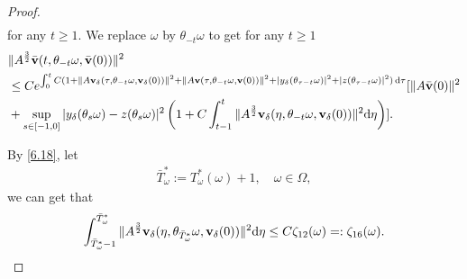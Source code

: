 \documentclass{elsarticle}
\theoremstyle{definition}
\numberwithin{equation}{section}
\renewcommand{\d}{{\rm{d}}}
\begin{document}
\begin{proof}
\begin{align*}
\end{align*}
for any $t\geq 1$.
We replace $\omega$ by $\theta_{-t}\omega$ to  get  for any $ t\geq 1$
\begin{align} \label{9.20}
 &\|A^\frac32\bar{\textbf{v}}(t,\theta_{-t}\omega,\bar{\textbf{v}}(0))\|^2\nonumber\\
&\leq Ce^{\int_0^tC( 1+\|A\textbf{\textbf{v}}_\delta(\tau,\theta_{-t}\omega,\textbf{\textbf{v}}_\delta(0))\|^2
+\|A\textbf{\textbf{v}}(\tau,\theta_{-t}\omega,\textbf{\textbf{v}}(0))\|^2
+|y_\delta(\theta_{\tau-t}\omega)|^2+|z(\theta_{\tau-t}\omega)|^2)\, \d \tau}[\|A\bar{\textbf{v}}(0)\|^2\nonumber\\
&+\sup\limits_{s\in[-1,0]}|y_\delta(\theta_s\omega)-z(\theta_s\omega)|^2\left(1+C\int_{t-1}^t \|A^\frac32\textbf{v}_\delta(\eta,\theta_{-t}\omega,\textbf{v}_\delta(0))\|^2
\d \eta\right) ].
\end{align}


By \eqref{6.18},   let
\begin{align*}
\bar{T}_\omega^* :=T_\omega^* (\omega)+1, \quad \omega\in \Omega,
\end{align*}
we can get that
\begin{align}\label{9.17}
  \int_{\bar{T}_\omega^* -1}^{\bar{T}_\omega^* }  \|A^\frac32\textbf{v}_\delta(\eta,\theta_{\bar{T}_\omega^* }\omega,\textbf{v}_\delta(0))\|^2  \d \eta
 \leq  C\zeta_{12}(\omega)  =: \zeta_{16}(\omega) .
 \end{align}


\end{proof}
\end{document}
